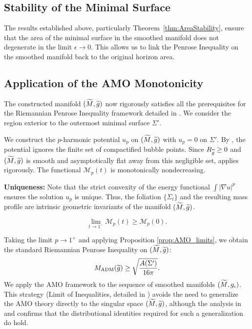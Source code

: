 \subsection{Stability of the Minimal Surface}
The results established above, particularly Theorem~\ref{thm:AreaStability}, ensure that the area of the minimal surface in the smoothed manifold does not degenerate in the limit $\epsilon \to 0$. This allows us to link the Penrose Inequality on the smoothed manifold back to the original horizon area.

\subsection{Application of the AMO Monotonicity}
\label{sec:AMOApplication}

The constructed manifold $(\widetilde{M}, \widetilde{g})$ now rigorously satisfies all the prerequisites for the Riemannian Penrose Inequality framework detailed in . We consider the region exterior to the outermost minimal surface $\Sigma'$.

We construct the $p$-harmonic potential $u_p$ on $(\widetilde{M}, \widetilde{g})$ with $u_p=0$ on $\Sigma'$. By , the potential ignores the finite set of compactified bubble points. Since $R_{\widetilde{g}} \ge 0$ and $(\widetilde{M}, \widetilde{g})$ is smooth and asymptotically flat away from this negligible set,  applies rigorously.
The functional $\mathcal{M}_p(t)$ is monotonically nondecreasing.

\textbf{Uniqueness:} Note that the strict convexity of the energy functional $\int |\nabla u|^p$ ensures the solution $u_p$ is unique. Thus, the foliation $\{\Sigma_t\}$ and the resulting mass profile are intrinsic geometric invariants of the manifold $(\widetilde{M}, \widetilde{g})$.

\begin{equation}\label{eq:MonotonicityApplied}
    \lim_{t \to 1^-} \mathcal{M}_p(t) \ge \mathcal{M}_p(0).
\end{equation}

Taking the limit $p \to 1^+$ and applying Proposition \ref{prop:AMO_limits}, we obtain the standard Riemannian Penrose Inequality on $(\widetilde{M}, \widetilde{g})$:
\begin{equation}
    M_{\mathrm{ADM}}(\widetilde{g}) \ge \sqrt{\frac{A(\Sigma')}{16\pi}}.
\end{equation}
We apply the AMO framework to the sequence of smoothed manifolds $(\widetilde{M}, g_{\epsilon})$. This strategy (Limit of Inequalities, detailed in ) avoids the need to generalize the AMO theory directly to the singular space $(\widetilde{M}, \widetilde{g})$, although the analysis in  and  confirms that the distributional identities required for such a generalization do hold.

